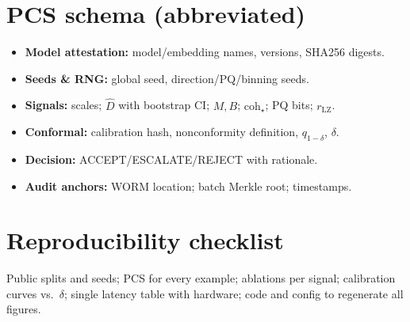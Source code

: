 \documentclass[11pt]{article}
\begin{document}
\section{PCS schema (abbreviated)}
\begin{itemize}
  \item \textbf{Model attestation:} model/embedding names, versions, SHA256 digests.
  \item \textbf{Seeds \& RNG:} global seed, direction/PQ/binning seeds.
  \item \textbf{Signals:} scales; $\hat D$ with bootstrap CI; $M,B$; $\mathrm{coh}_\star$; PQ bits; $r_{\mathrm{LZ}}$.
  \item \textbf{Conformal:} calibration hash, nonconformity definition, $q_{1-\delta}$, $\delta$.
  \item \textbf{Decision:} \textsc{ACCEPT}/\textsc{ESCALATE}/\textsc{REJECT} with rationale.
  \item \textbf{Audit anchors:} WORM location; batch Merkle root; timestamps.
\end{itemize}

\section{Reproducibility checklist}
Public splits and seeds; PCS for every example; ablations per signal; calibration curves vs.\ $\delta$; single latency table with hardware; code and config to regenerate all figures.
\end{document}

